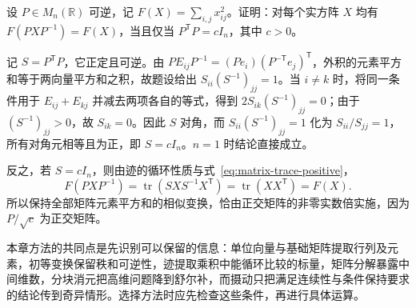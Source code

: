 \begin{example}
\label{ex:matrix-training-norm-similarity}
设 $P\in M_n(\mathbb R)$ 可逆，记 $F(X)=\sum_{i,j}x_{ij}^2$。证明：对每个实方阵 $X$ 均有 $F(PXP^{-1})=F(X)$，当且仅当 $P^{\mathsf T}P=cI_n$，其中 $c>0$。
\end{example}
\begin{solve}
记 $S=P^{\mathsf T}P$，它正定且可逆。由 $PE_{ij}P^{-1}=(Pe_i)(P^{-\mathsf T}e_j)^{\mathsf T}$，外积的元素平方和等于两向量平方和之积，故题设给出 $S_{ii}(S^{-1})_{jj}=1$。当 $i\ne k$ 时，将同一条件用于 $E_{ij}+E_{kj}$ 并减去两项各自的等式，得到 $2S_{ik}(S^{-1})_{jj}=0$；由于 $(S^{-1})_{jj}>0$，故 $S_{ik}=0$。因此 $S$ 对角，而 $S_{ii}(S^{-1})_{jj}=1$ 化为 $S_{ii}/S_{jj}=1$，所有对角元相等且为正，即 $S=cI_n$。$n=1$ 时结论直接成立。

反之，若 $S=cI_n$，则由迹的循环性质与式~\eqref{eq:matrix-trace-positive}，
\[
 F(PXP^{-1})
 =\operatorname{tr}(SXS^{-1}X^{\mathsf T})
 =\operatorname{tr}(XX^{\mathsf T})=F(X).
\]
所以保持全部矩阵元素平方和的相似变换，恰由正交矩阵的非零实数倍实施，因为 $P/\sqrt c$ 为正交矩阵。
\end{solve}

本章方法的共同点是先识别可以保留的信息：单位向量与基础矩阵提取行列及元素，初等变换保留秩和可逆性，迹提取乘积中能循环比较的标量，矩阵分解暴露中间维数，分块消元把高维问题降到舒尔补，而摄动只把满足连续性与条件保持要求的结论传到奇异情形。选择方法时应先检查这些条件，再进行具体运算。





